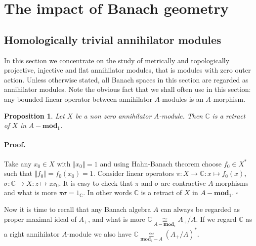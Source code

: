 \documentclass[12pt]{article}
\newcommand{\isom}[1]{\mathop{\mathbin{\cong}}\limits_{#1}}
\newtheorem{proposition}[theorem]{Proposition}
\renewenvironment{proof}{\paragraph{Proof.}}{\hfill$\square$\medskip}
\begin{document}

\section{The impact of Banach geometry}\label{SectionTheImpactOfBanachGeometry}



\subsection{Homologically trivial annihilator
    modules}\label{SubSectionHomoligicallyTrivialAnnihilatorModules}

In this section we concentrate on the study of metrically and topologically
projective, injective and flat annihilator modules, that is modules with zero
outer action. Unless otherwise stated, all Banach spaces in this section are
regarded as annihilator modules. Note the obvious fact that we shall often use
in this section: any bounded linear operator between annihilator $A$-modules is
an $A$-morphism.

\begin{proposition}\label{AnnihCModIsRetAnnihMod} Let $X$ be a non zero
    annihilator $A$-module. Then $\mathbb{C}$ is a retract of $X$ in 
    $A-\mathbf{mod}_1$.
\end{proposition}
\begin{proof} Take any $x_0\in X$ with $\Vert x_0\Vert=1$ and using Hahn-Banach
    theorem choose $f_0\in X^*$ such that $\Vert f_0\Vert=f_0(x_0)=1$. Consider
    linear operators $\pi:X\to \mathbb{C}:x\mapsto f_0(x)$,
    $\sigma:\mathbb{C}\to X:z\mapsto zx_0$. It is easy to check that $\pi$ and
    $\sigma$ are contractive $A$-morphisms and what is more
    $\pi\sigma=1_\mathbb{C}$. In other words $\mathbb{C}$ is a retract of $X$ in
    $A-\mathbf{mod}_1$.
\end{proof}

Now it is time to recall that any Banach algebra $A$ can always be regarded as
proper maximal ideal of $A_+$, and what is more
$\mathbb{C}\isom{A-\mathbf{mod}_1} A_+/A$. If we regard $\mathbb{C}$ as a right
annihilator $A$-module we also have 
$\mathbb{C}\isom{\mathbf{mod}_1-A}{(A_+/A)}^*$.
\end{document}
